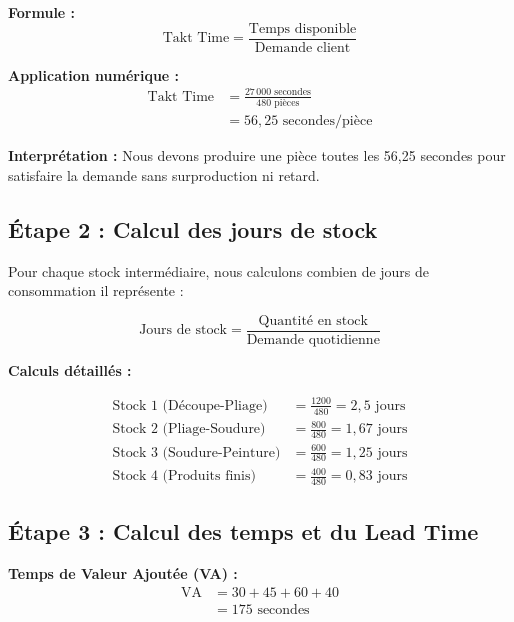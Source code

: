 \documentclass[12pt,a4paper]{article}
\begin{document}
\textbf{Formule :}
\begin{equation}
    \text{Takt Time} = \frac{\text{Temps disponible}}{\text{Demande client}}
\end{equation}

\textbf{Application numérique :}
\begin{align*}
    \text{Takt Time} &= \frac{27\,000 \text{ secondes}}{480 \text{ pièces}} \\
    &= 56{,}25 \text{ secondes/pièce}
\end{align*}

\textbf{Interprétation :} Nous devons produire une pièce toutes les 56,25 secondes pour satisfaire la demande sans surproduction ni retard.

\subsection{Étape 2 : Calcul des jours de stock}

Pour chaque stock intermédiaire, nous calculons combien de jours de consommation il représente :

\begin{equation}
    \text{Jours de stock} = \frac{\text{Quantité en stock}}{\text{Demande quotidienne}}
\end{equation}

\textbf{Calculs détaillés :}

\begin{align*}
    \text{Stock 1 (Découpe-Pliage)} &= \frac{1200}{480} = 2{,}5 \text{ jours} \\[0.3cm]
    \text{Stock 2 (Pliage-Soudure)} &= \frac{800}{480} = 1{,}67 \text{ jours} \\[0.3cm]
    \text{Stock 3 (Soudure-Peinture)} &= \frac{600}{480} = 1{,}25 \text{ jours} \\[0.3cm]
    \text{Stock 4 (Produits finis)} &= \frac{400}{480} = 0{,}83 \text{ jours}
\end{align*}

\subsection{Étape 3 : Calcul des temps et du Lead Time}

\textbf{Temps de Valeur Ajoutée (VA) :}
\begin{align*}
    \text{VA} &= 30 + 45 + 60 + 40 \\
    &= 175 \text{ secondes}
\end{align*}
\end{document}
